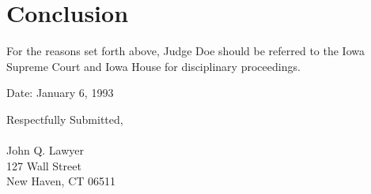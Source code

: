 \documentclass[12pt,\documentclassflag]{complaint}
\begin{document}
\section{Conclusion}

For the reasons set forth above, Judge Doe should be referred to the Iowa Supreme Court and Iowa House for disciplinary proceedings.

\noindent Date: January 6, 1993

\begin{rightbox}
Respectfully Submitted,\\
~\\
John Q. Lawyer\\
127 Wall Street\\
New Haven, CT 06511\\
\end{rightbox}
\end{document}
